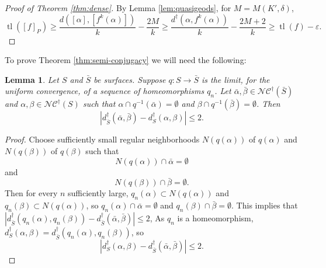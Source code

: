 \documentclass{amsart}
\newcommand{\NC}{\mathcal{NC}}
\newcommand{\NCdagger}{\NC^\dagger}
\newcommand{\tl}[1]{\operatorname{tl}(#1)}
\newcommand{\dist}{d}
\newcommand{\distdagger}{d^\dagger}
\newtheorem{lemma}[thm]{Lemma}
\theoremstyle{definition}
\begin{document}
\begin{proof}[Proof of Theorem \ref{thm:dense}]
By Lemma \ref{lem:quasigeods}, for \(M=M(K',\delta)\),
\[\tl{[f]_{P}}\geq \frac{\dist([\alpha],[f^k(\alpha)])}{k}-\frac{2M}{k}\geq \frac{\distdagger(\alpha,f^k(\alpha))}{k}-\frac{2M+2}{k}\geq \tl{f}-\varepsilon.\]
\end{proof}

To prove Theorem \ref{thm:semi-conjugacy} we will need the following:

\begin{lemma}\label{lem:limit-homeos}
Let \(S\) and \(\bar{S}\) be surfaces. Suppose \(q:S\to \bar{S}\) is the limit, for the uniform convergence, of a sequence of homeomorphisms \(q_n\). Let \(\bar{\alpha},\bar{\beta}\in\NCdagger(\bar{S})\) and \(\alpha,\beta\in \NCdagger(S)\) such that \(\alpha\cap q^{-1}(\bar{\alpha})=\emptyset\) and \( \beta\cap q^{-1}(\bar{\beta})=\emptyset\). Then
\[|\distdagger_{\bar{S}}(\bar{\alpha},\bar{\beta})-\distdagger_S(\alpha,\beta)|\leq 2.\]
\end{lemma}

\begin{proof}
Choose sufficiently small regular neighborhoods \(N(q(\alpha))\) of \(q(\alpha)\) and \(N(q(\beta))\) of \(q(\beta)\) such that
\[N(q(\alpha))\cap\bar{\alpha}=\emptyset\]
and
\[N(q(\beta))\cap\bar{\beta}=\emptyset.\]
Then for every \(n\) sufficiently large, \(q_n(\alpha)\subset N(q(\alpha))\) and \(q_n(\beta)\subset N(q(\alpha))\), so \(q_n(\alpha)\cap \bar{\alpha}=\emptyset\) and \(q_n(\beta)\cap \bar{\beta}=\emptyset\). This implies that \(|\distdagger_{\bar{S}}(q_n(\alpha),q_n(\beta))-\distdagger_{\bar{S}}(\bar{\alpha},\bar{\beta})|\leq 2\), As \(q_n\) is a homeomorphism,
\(\distdagger_S(\alpha,\beta)=\distdagger_{\bar{S}}(q_n(\alpha),q_n(\beta))\), so
\[|\distdagger_S(\alpha,\beta)-\distdagger_{\bar{S}}(\bar{\alpha},\bar{\beta})|\leq 2.\]
\end{proof}
\end{document}
